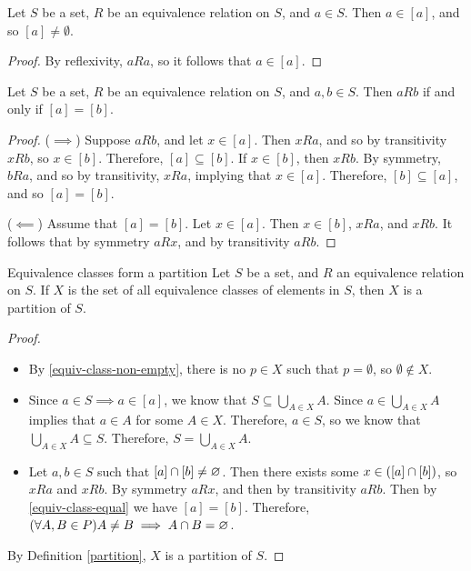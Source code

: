 \begin{lemma}\label{equiv-class-non-empty}
    Let $S$ be a set, $R$ be an equivalence relation on $S$, and $a \in S$. Then $a \in [a]$, and so $[a] \neq \emptyset$.
\end{lemma}

\begin{proof}
    By reflexivity, $a R a$, so it follows that $a \in [a]$.
\end{proof}

\begin{lemma}\label{equiv-class-equal}
    Let $S$ be a set, $R$ be an equivalence relation on $S$, and $a, b \in S$. Then $a R b$ if and only if $[a] = [b]$.
\end{lemma}

\begin{proof}\proofbreak
    ($\implies$) Suppose $a R b$, and let $x \in [a]$. Then $x R a$, and so by transitivity $x R b$, so $x \in [b]$. Therefore, $[a] \subseteq [b]$. If $x \in [b]$, then $x R b$. By symmetry, $b R a$, and so by transitivity, $x R a$, implying that $x \in [a]$. Therefore, $[b] \subseteq [a]$, and so $[a] = [b]$.

    ($\impliedby$) Assume that $[a] = [b]$. Let $x \in [a]$. Then $x \in [b]$, $x R a$, and $x R b$. It follows that by symmetry $a R x$, and by transitivity $a R b$.
\end{proof}

\begin{thm}Equivalence classes form a partition\label{equiv-classes-form-partition}\proofbreak
    Let $S$ be a set, and $R$ an equivalence relation on $S$. If $X$ is the set of all equivalence classes of elements in $S$, then $X$ is a partition of $S$.
\end{thm}

\begin{proof}\proofbreak
    \begin{itemize}
        \item By \ref{equiv-class-non-empty}, there is no $p \in X$ such that $p = \emptyset$, so $\emptyset \notin X$.
        \item Since $a \in S \implies a \in \left[a\right]$, we know that $S \subseteq \bigcup_{A\in X}A$. Since $a \in \bigcup_{A\in X}A$ implies that $a \in A$ for some $A \in X$. Therefore, $a \in S$, so we know that $\bigcup_{A\in X}A \subseteq S$. Therefore, $S = \bigcup_{A\in X}A$.
        \item Let $a, b \in S$ such that $\left[a\right] \cap \left[b\right] \neq \varnothing$. Then there exists some $x \in (\left[a\right] \cap \left[b\right])$, so $x R a$ and $x R b$. By symmetry $a R x$, and then by transitivity $a R b$. Then by \ref{equiv-class-equal} we have $\left[a\right] = \left[b\right]$. Therefore, $(\forall A, B \in P) A \neq B \implies A \cap B = \varnothing$.
    \end{itemize}
    By Definition \ref{partition}, $X$ is a partition of $S$.
\end{proof}

